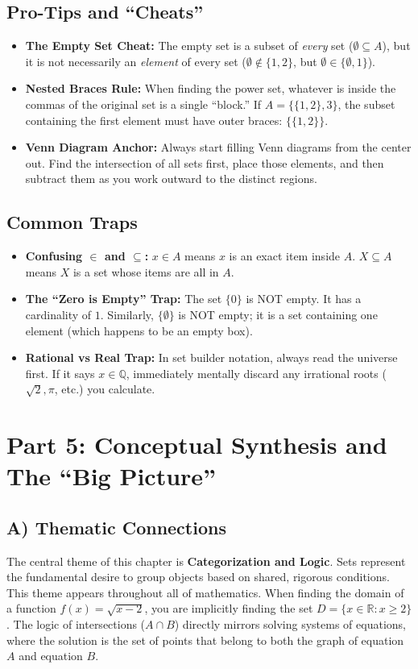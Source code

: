 \documentclass[12pt]{article}
\begin{document}
\subsection{Pro-Tips and ``Cheats''}
\begin{itemize}
    \item \textbf{The Empty Set Cheat:} The empty set is a subset of \textit{every} set ($\emptyset \subseteq A$), but it is not necessarily an \textit{element} of every set ($\emptyset \notin \{1, 2\}$, but $\emptyset \in \{\emptyset, 1\}$). 
    \item \textbf{Nested Braces Rule:} When finding the power set, whatever is inside the commas of the original set is a single ``block.'' If $A = \{ \{1, 2\}, 3 \}$, the subset containing the first element must have outer braces: $\{ \{1, 2\} \}$.
    \item \textbf{Venn Diagram Anchor:} Always start filling Venn diagrams from the center out. Find the intersection of all sets first, place those elements, and then subtract them as you work outward to the distinct regions.
\end{itemize}

\subsection{Common Traps}
\begin{itemize}
    \item \textbf{Confusing $\in$ and $\subseteq$:} $x \in A$ means $x$ is an exact item inside $A$. $X \subseteq A$ means $X$ is a set whose items are all in $A$.
    \item \textbf{The ``Zero is Empty'' Trap:} The set $\{0\}$ is NOT empty. It has a cardinality of $1$. Similarly, $\{\emptyset\}$ is NOT empty; it is a set containing one element (which happens to be an empty box).
    \item \textbf{Rational vs Real Trap:} In set builder notation, always read the universe first. If it says $x \in \mathbb{Q}$, immediately mentally discard any irrational roots ($\sqrt{2}, \pi$, etc.) you calculate.
\end{itemize}

\newpage
\section{Part 5: Conceptual Synthesis and The ``Big Picture''}

\subsection{A) Thematic Connections}
The central theme of this chapter is \textbf{Categorization and Logic}. Sets represent the fundamental desire to group objects based on shared, rigorous conditions. 
This theme appears throughout all of mathematics. When finding the domain of a function $f(x) = \sqrt{x-2}$, you are implicitly finding the set $D = \{x \in \mathbb{R} : x \ge 2\}$. The logic of intersections ($A \cap B$) directly mirrors solving systems of equations, where the solution is the set of points that belong to both the graph of equation $A$ and equation $B$.
\end{document}
